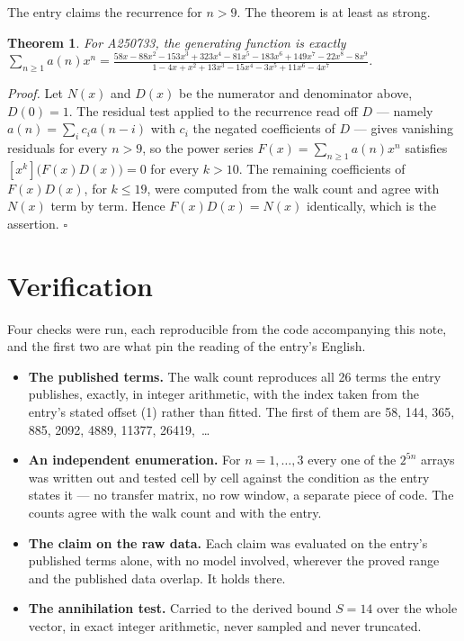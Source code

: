 \documentclass[11pt]{article}
\newtheorem{theorem}{Theorem}
\theoremstyle{definition}
\begin{document}
The entry claims the recurrence for $n > 9$. The theorem is at least as strong.

\begin{theorem} For A250733, the generating function is exactly $\sum_{n\ge 1} a(n)x^n = \frac{58x - 88x^{2} - 153x^{3} + 323x^{4} - 81x^{5} - 183x^{6} + 149x^{7} - 22x^{8} - 8x^{9}}{1 - 4x + x^{2} + 13x^{3} - 15x^{4} - 3x^{5} + 11x^{6} - 4x^{7}}$.\end{theorem}

{\itshape Proof.} Let $N(x)$ and $D(x)$ be the numerator and denominator above, $D(0)=1$. The residual test applied to the recurrence read off $D$ --- namely $a(n) = \sum_i c_i a(n-i)$ with $c_i$ the negated coefficients of $D$ --- gives vanishing residuals for every $n > 9$, so the power series $F(x)=\sum_{n\ge 1}a(n)x^n$ satisfies $[x^k]\bigl(F(x)D(x)\bigr) = 0$ for every $k > 10$. The remaining coefficients of $F(x)D(x)$, for $k \le 19$, were computed from the walk count and agree with $N(x)$ term by term. Hence $F(x)D(x) = N(x)$ identically, which is the assertion. $\square$

\section{Verification}

Four checks were run, each reproducible from the code accompanying this note, and the first two are what pin the reading of the entry's English.

\begin{itemize}

\item {\bfseries The published terms.} The walk count reproduces all 26 terms the entry publishes, exactly, in integer arithmetic, with the index taken from the entry's stated offset (1) rather than fitted. The first of them are 58, 144, 365, 885, 2092, 4889, 11377, 26419,~\dots

\item {\bfseries An independent enumeration.} For $n = 1,\dots,3$ every one of the $2^{5n}$ arrays was written out and tested cell by cell against the condition as the entry states it --- no transfer matrix, no row window, a separate piece of code. The counts agree with the walk count and with the entry.

\item {\bfseries The claim on the raw data.} Each claim was evaluated on the entry's published terms alone, with no model involved, wherever the proved range and the published data overlap. It holds there.

\item {\bfseries The annihilation test.} Carried to the derived bound $S = 14$ over the whole vector, in exact integer arithmetic, never sampled and never truncated.

\end{itemize}
\end{document}
